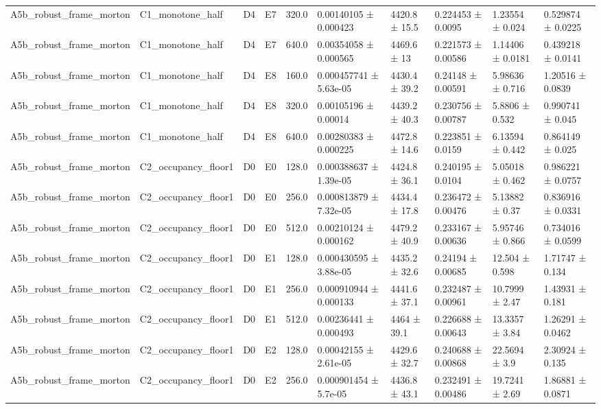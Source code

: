 \begin{table}
\begin{tabular}{llllllllll}
A5b\_robust\_frame\_morton & C1\_monotone\_half & D4 & E7 & 320.0 & 0.00140105 ± 0.000423 & 4420.8 ± 15.5 & 0.224453 ± 0.0095 & 1.23554 ± 0.024 & 0.529874 ± 0.0225 \\
A5b\_robust\_frame\_morton & C1\_monotone\_half & D4 & E7 & 640.0 & 0.00354058 ± 0.000565 & 4469.6 ± 13 & 0.221573 ± 0.00586 & 1.14406 ± 0.0181 & 0.439218 ± 0.0141 \\
A5b\_robust\_frame\_morton & C1\_monotone\_half & D4 & E8 & 160.0 & 0.000457741 ± 5.63e-05 & 4430.4 ± 39.2 & 0.24148 ± 0.00591 & 5.98636 ± 0.716 & 1.20516 ± 0.0839 \\
A5b\_robust\_frame\_morton & C1\_monotone\_half & D4 & E8 & 320.0 & 0.00105196 ± 0.00014 & 4439.2 ± 40.3 & 0.230756 ± 0.00787 & 5.8806 ± 0.532 & 0.990741 ± 0.045 \\
A5b\_robust\_frame\_morton & C1\_monotone\_half & D4 & E8 & 640.0 & 0.00280383 ± 0.000225 & 4472.8 ± 14.6 & 0.223851 ± 0.0159 & 6.13594 ± 0.442 & 0.864149 ± 0.025 \\
A5b\_robust\_frame\_morton & C2\_occupancy\_floor1 & D0 & E0 & 128.0 & 0.000388637 ± 1.39e-05 & 4424.8 ± 36.1 & 0.240195 ± 0.0104 & 5.05018 ± 0.462 & 0.986221 ± 0.0757 \\
A5b\_robust\_frame\_morton & C2\_occupancy\_floor1 & D0 & E0 & 256.0 & 0.000813879 ± 7.32e-05 & 4434.4 ± 17.8 & 0.236472 ± 0.00476 & 5.13882 ± 0.37 & 0.836916 ± 0.0331 \\
A5b\_robust\_frame\_morton & C2\_occupancy\_floor1 & D0 & E0 & 512.0 & 0.00210124 ± 0.000162 & 4479.2 ± 40.9 & 0.233167 ± 0.00636 & 5.95746 ± 0.866 & 0.734016 ± 0.0599 \\
A5b\_robust\_frame\_morton & C2\_occupancy\_floor1 & D0 & E1 & 128.0 & 0.000430595 ± 3.88e-05 & 4435.2 ± 32.6 & 0.24194 ± 0.00685 & 12.504 ± 0.598 & 1.71747 ± 0.134 \\
A5b\_robust\_frame\_morton & C2\_occupancy\_floor1 & D0 & E1 & 256.0 & 0.000910944 ± 0.000133 & 4441.6 ± 37.1 & 0.232487 ± 0.00961 & 10.7999 ± 2.47 & 1.43931 ± 0.181 \\
A5b\_robust\_frame\_morton & C2\_occupancy\_floor1 & D0 & E1 & 512.0 & 0.00236441 ± 0.000493 & 4464 ± 39.1 & 0.226688 ± 0.00643 & 13.3357 ± 3.84 & 1.26291 ± 0.0462 \\
A5b\_robust\_frame\_morton & C2\_occupancy\_floor1 & D0 & E2 & 128.0 & 0.00042155 ± 2.61e-05 & 4429.6 ± 32.7 & 0.240688 ± 0.00868 & 22.5694 ± 3.9 & 2.30924 ± 0.135 \\
A5b\_robust\_frame\_morton & C2\_occupancy\_floor1 & D0 & E2 & 256.0 & 0.000901454 ± 5.7e-05 & 4436.8 ± 43.1 & 0.232491 ± 0.00486 & 19.7241 ± 2.69 & 1.86881 ± 0.0871 \\

\end{tabular}
\end{table}
